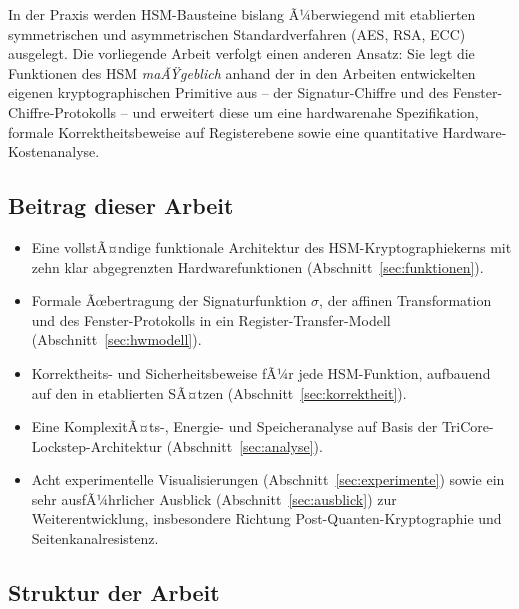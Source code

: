 ﻿\documentclass[a4paper,12pt]{article}
\theoremstyle{definition}
\begin{document}
In der Praxis werden HSM-Bausteine bislang Ã¼berwiegend mit etablierten symmetrischen und asymmetrischen Standardverfahren (AES, RSA, ECC) ausgelegt. Die vorliegende Arbeit verfolgt einen anderen Ansatz: Sie legt die Funktionen des HSM \emph{maÃŸgeblich} anhand der in den Arbeiten \cite{Epp26b,Epp26c} entwickelten eigenen kryptographischen Primitive aus -- der Signatur-Chiffre und des Fenster-Chiffre-Protokolls -- und erweitert diese um eine hardwarenahe Spezifikation, formale Korrektheitsbeweise auf Registerebene sowie eine quantitative Hardware-Kostenanalyse.

\subsection{Beitrag dieser Arbeit}

\begin{itemize}
	\item Eine vollstÃ¤ndige funktionale Architektur des HSM-Kryptographiekerns mit zehn klar abgegrenzten Hardwarefunktionen (Abschnitt~\ref{sec:funktionen}).
	\item Formale Ãœbertragung der Signaturfunktion $\sigma$, der affinen Transformation und des Fenster-Protokolls in ein Register-Transfer-Modell (Abschnitt~\ref{sec:hwmodell}).
	\item Korrektheits- und Sicherheitsbeweise fÃ¼r jede HSM-Funktion, aufbauend auf den in \cite{Epp26b,Epp26c,Epp26a} etablierten SÃ¤tzen (Abschnitt~\ref{sec:korrektheit}).
	\item Eine KomplexitÃ¤ts-, Energie- und Speicheranalyse auf Basis der TriCore-Lockstep-Architektur (Abschnitt~\ref{sec:analyse}).
	\item Acht experimentelle Visualisierungen (Abschnitt~\ref{sec:experimente}) sowie ein sehr ausfÃ¼hrlicher Ausblick (Abschnitt~\ref{sec:ausblick}) zur Weiterentwicklung, insbesondere Richtung Post-Quanten-Kryptographie und Seitenkanalresistenz.
\end{itemize}

\subsection{Struktur der Arbeit}
\end{document}
